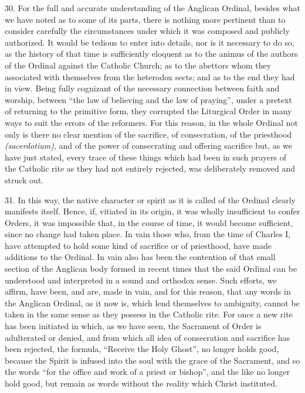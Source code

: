 30. For the full and accurate understanding of the Anglican Ordinal,
besides what we have noted as to some of its parts, there is nothing
more pertinent than to consider carefully the circumstances under which
it was composed and publicly authorized. It would be tedious to enter
into details, nor is it necessary to do so, as the history of that time
is sufficiently eloquent as to the animus of the authors of the Ordinal
against the Catholic Church; as to the abettors whom they associated
with themselves from the heterodox sects; and as to the end they had in
view. Being fully cognizant of the necessary connection between faith
and worship, between ``the law of believing and the law of praying'',
under a pretext of returning to the primitive form, they corrupted the
Liturgical Order in many ways to suit the errors of the reformers. For
this reason, in the whole Ordinal not only is there no clear mention of
the sacrifice, of consecration, of the priesthood \emph{(sacerdotium)},
and of the power of consecrating and offering sacrifice but, as we have
just stated, every trace of these things which had been in such prayers
of the Catholic rite as they had not entirely rejected, was deliberately
removed and struck out.

31. In this way, the native character or spirit as it is called of the
Ordinal clearly manifests itself. Hence, if, vitiated in its origin, it
was wholly insufficient to confer Orders, it was impossible that, in the
course of time, it would become sufficient, since no change had taken
place. In vain those who, from the time of Charles I, have attempted to
hold some kind of sacrifice or of priesthood, have made additions to the
Ordinal. In vain also has been the contention of that small section of
the Anglican body formed in recent times that the said Ordinal can be
understood and interpreted in a sound and orthodox sense. Such efforts,
we affirm, have been, and are, made in vain, and for this reason, that
any words in the Anglican Ordinal, as it now is, which lend themselves
to ambiguity, cannot be taken in the same sense as they possess in the
Catholic rite. For once a new rite has been initiated in which, as we
have seen, the Sacrament of Order is adulterated or denied, and from
which all idea of consecration and sacrifice has been rejected, the
formula, ``Receive the Holy Ghost'', no longer holds good, because the
Spirit is infused into the soul with the grace of the Sacrament, and so
the words ``for the office and work of a priest or bishop'', and the
like no longer hold good, but remain as words without the reality which
Christ instituted.

